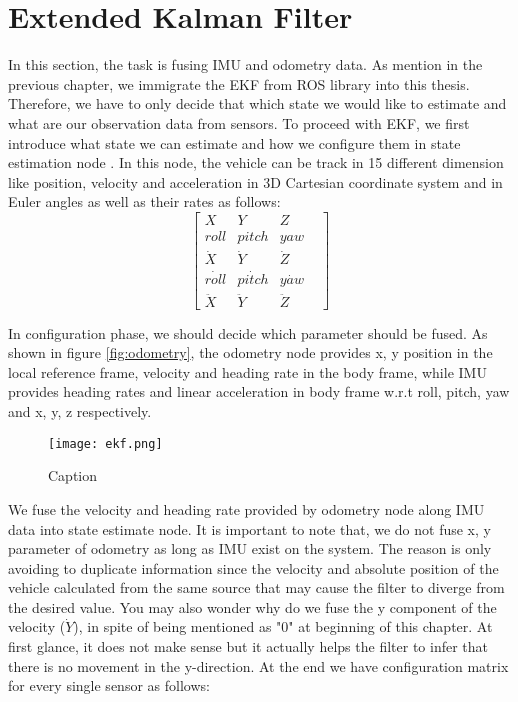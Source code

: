 \section{Extended Kalman Filter}
In this section, the task is fusing IMU and odometry data. As mention in the previous chapter, we immigrate the EKF from ROS library into this thesis. Therefore, we have to only decide that which state we would like to estimate and what are our observation data from sensors. To proceed with EKF, we first introduce what state we can estimate and how we configure them in state estimation node \cite{kalman7}. In this node, the vehicle can be track in 15 different dimension like position, velocity and acceleration in 3D Cartesian coordinate system and in Euler angles as well as their rates as follows:
\begin{equation}\label{eq:state}
 \begin{bmatrix}
X & Y &Z\\
roll& pitch& yaw&\\
\dot X & \dot Y& \dot Z\\
\dot {roll} & \dot {pitch}& \dot {yaw}\\
\ddot X & \ddot Y& \ddot Z
\end{bmatrix}   
\end{equation}
\par In configuration phase, we should decide which parameter should be fused. As shown in figure \ref{fig:odometry}, the odometry node provides x, y position in the local reference frame, velocity and heading rate in the body frame, while IMU provides heading rates and linear acceleration in body frame w.r.t roll, pitch, yaw and x, y, z respectively.
\\
\begin{figure}[H]
    \centering
    \texttt{[image: ekf.png]}
    \caption{Caption}
    \label{fig:ekf_node}
\end{figure}
\newpage
We fuse the velocity and heading rate provided by odometry node along IMU data into state estimate node. It is important to note that, we do not fuse x, y parameter of odometry as long as IMU exist on the system. The reason is only avoiding to duplicate information since the velocity and absolute position of the vehicle calculated from the same source that may cause the filter to diverge from the desired value. You may also wonder why do we fuse the y component of the velocity ($\dot Y$), in spite of being mentioned as "0" at beginning of this chapter. At first glance, it does not make sense but it actually helps the filter to infer that there is no movement in the y-direction. At the end we have configuration matrix for every single sensor as follows:
